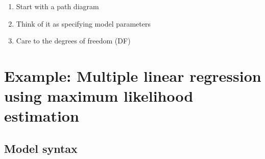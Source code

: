 \documentclass[
]{book}
\begin{document}
\begin{enumerate}
\def\labelenumi{\arabic{enumi}.}
\item
  Start with a path diagram
\item
  Think of it as specifying model parameters
\item
  Care to the degrees of freedom (DF)
\end{enumerate}

\hypertarget{example-multiple-linear-regression-using-maximum-likelihood-estimation}{%
\section{Example: Multiple linear regression using maximum likelihood estimation}\label{example-multiple-linear-regression-using-maximum-likelihood-estimation}}

\hypertarget{model-syntax}{%
\subsection{Model syntax}\label{model-syntax}}
\end{document}
